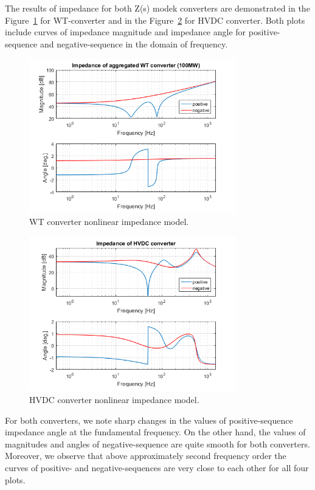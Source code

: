 \documentclass[12pt]{report} %
\begin{document}
The results of impedance for both Z(s) modek converters are demonstrated in the Figure~\ref{fig:wtmodel} for WT-converter and in the Figure~\ref{fig:hvdcmodel} for HVDC converter. Both plots include curves of impedance magnitude and impedance angle for positive-sequence and negative-sequence in the domain of frequency.

\begin{figure}[htb]
	\centering
	\includegraphics[width=0.8\textwidth]{img/modelWT.png}
  	\caption{WT converter nonlinear impedance model.}
  	\label{fig:wtmodel}
\end{figure}

\FloatBarrier
\begin{figure}[htb]
	\centering
	\includegraphics[width=0.8\textwidth]{img/modelHVDC.png}
  	\caption{HVDC converter nonlinear impedance model.}
  	\label{fig:hvdcmodel}
\end{figure}
\FloatBarrier

For both converters, we note sharp changes in the values of positive-sequence impedance angle at the fundamental frequency. On the other hand, the values of magnitudes and angles of negative-sequence are quite smooth for both converters. Moreover, we observe that above approximately second frequency order the curves of positive- and negative-sequences are very close to each other for all four plots.
\end{document}

